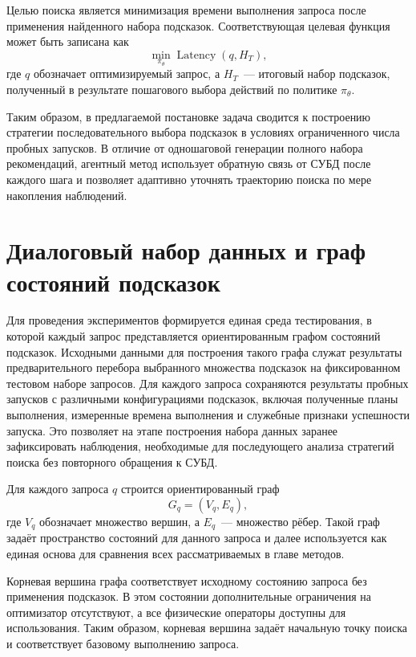 Целью поиска является минимизация времени выполнения запроса после применения найденного набора подсказок. Соответствующая целевая функция может быть записана как
\begin{equation}
    \label{eq:objective_latency}
    \min_{\pi_\theta} \operatorname{Latency}(q, H_T),
\end{equation}
где $q$ обозначает оптимизируемый запрос, а $H_T$~--- итоговый набор подсказок, полученный в результате пошагового выбора действий по политике $\pi_\theta$.

Таким образом, в предлагаемой постановке задача сводится к построению стратегии последовательного выбора подсказок в условиях ограниченного числа пробных запусков. В отличие от одношаговой генерации полного набора рекомендаций, агентный метод использует обратную связь от СУБД после каждого шага и позволяет адаптивно уточнять траекторию поиска по мере накопления наблюдений.

\section{Диалоговый набор данных и граф состояний подсказок}\label{sec:ch4_dataset}

Для проведения экспериментов формируется единая среда тестирования, в которой каждый запрос представляется ориентированным графом состояний подсказок. Исходными данными для построения такого графа служат результаты предварительного перебора выбранного множества подсказок на фиксированном тестовом наборе запросов. Для каждого запроса сохраняются результаты пробных запусков с различными конфигурациями подсказок, включая полученные планы выполнения, измеренные времена выполнения и служебные признаки успешности запуска. Это позволяет на этапе построения набора данных заранее зафиксировать наблюдения, необходимые для последующего анализа стратегий поиска без повторного обращения к СУБД.

Для каждого запроса \(q\) строится ориентированный граф
\begin{equation}
    G_q = (V_q, E_q),
\end{equation}
где \(V_q\) обозначает множество вершин, а \(E_q\)~--- множество рёбер. Такой граф задаёт пространство состояний для данного запроса и далее используется как единая основа для сравнения всех рассматриваемых в главе методов.

Корневая вершина графа соответствует исходному состоянию запроса без применения подсказок. В этом состоянии дополнительные ограничения на оптимизатор отсутствуют, а все физические операторы доступны для использования. Таким образом, корневая вершина задаёт начальную точку поиска и соответствует базовому выполнению запроса.

